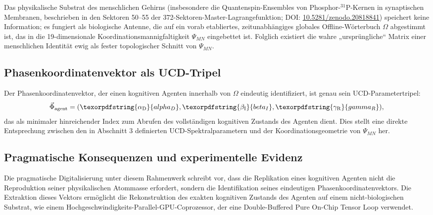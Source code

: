 \documentclass[12pt,a4paper]{article}
\DeclareRobustCommand{\alD}{\texorpdfstring{\ensuremath{\alpha_{\mathrm{D}}}}{alpha_D}}
\DeclareRobustCommand{\beI}{\texorpdfstring{\ensuremath{\beta_{\mathrm{I}}}}{beta_I}}
\DeclareRobustCommand{\gaR}{\texorpdfstring{\ensuremath{\gamma_{\mathrm{R}}}}{gamma_R}}
\begin{document}
	Das physikalische Substrat des menschlichen Gehirns (insbesondere die Quantenspin-Ensembles von Phosphor-\(^{31}\)P-Kernen in synaptischen Membranen, beschrieben in den Sektoren 50--55 der 372-Sektoren-Master-Lagrangefunktion; DOI: \href{https://doi.org/10.5281/zenodo.20818841}{10.5281/zenodo.20818841}) speichert keine Information; es fungiert als biologische Antenne, die auf ein vorab etabliertes, zeitunabhängiges globales Offline-Wörterbuch \(\Omega\) abgestimmt ist, das in die 19-dimensionale Koordinationsmannigfaltigkeit \(\Psi_{MN}\) eingebettet ist. Folglich existiert die wahre „ursprüngliche`` Matrix einer menschlichen Identität ewig als fester topologischer Schnitt von \(\Psi_{MN}\).
	
	\subsection{Phasenkoordinatenvektor als UCD-Tripel}
	
	Der Phasenkoordinatenvektor, der einen kognitiven Agenten innerhalb von \(\Omega\) eindeutig identifiziert, ist genau sein UCD-Parametertripel:
	\[
	\vec{\Phi}_{\mathrm{agent}} = (\alD, \beI, \gaR),
	\]
	das als minimaler hinreichender Index zum Abrufen des vollständigen kognitiven Zustands des Agenten dient. Dies stellt eine direkte Entsprechung zwischen den in Abschnitt 3 definierten UCD-Spektralparametern und der Koordinationsgeometrie von \(\Psi_{MN}\) her.
	
	\subsection{Pragmatische Konsequenzen und experimentelle Evidenz}
	
	Die pragmatische Digitalisierung unter diesem Rahmenwerk schreibt vor, dass die Replikation eines kognitiven Agenten nicht die Reproduktion seiner physikalischen Atommasse erfordert, sondern die Identifikation seines eindeutigen Phasenkoordinatenvektors. Die Extraktion dieses Vektors ermöglicht die Rekonstruktion des exakten kognitiven Zustands des Agenten auf einem nicht-biologischen Substrat, wie einem Hochgeschwindigkeits-Parallel-GPU-Coprozessor, der eine Double-Buffered Pure On-Chip Tensor Loop verwendet.
	
\end{document}
